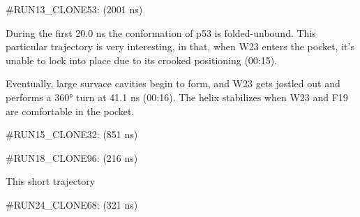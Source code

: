 \#RUN13\_CLONE53: (2001 ns)

During the first 20.0 ns the conformation of p53 is folded-unbound. This
particular trajectory is very interesting, in that, when W23 enters the
pocket, it's unable to lock into place due to its crooked positioning
(00:15).

Eventually, large survace cavities begin to form, and W23 gets jostled
out and performs a 360° turn at 41.1 ns (00:16). The helix stabilizes
when W23 and F19 are comfortable in the pocket.

\#RUN15\_CLONE32: (851 ns)

\#RUN18\_CLONE96: (216 ns)

This short trajectory

\#RUN24\_CLONE68: (321 ns)